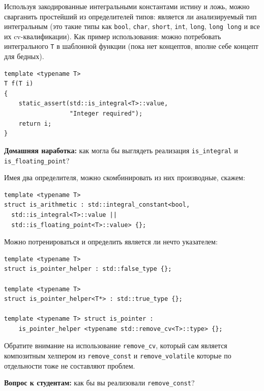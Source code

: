 \documentclass[a4paper,12pt,oneside]{article}
\newif\ifanswers
\begin{document}
Используя закодированные интегральными константами истину и ложь, можно сварганить простейший из определителей типов: является ли анализируемый тип интегральным (это такие типы как \lstinline!bool!, \lstinline!char!, \lstinline!short!, \lstinline!int!, \lstinline!long!, \lstinline!long long! и все их cv-квалификации). Как пример использования: можно потребовать интегрального \lstinline!T! в шаблонной функции (пока нет концептов, вполне себе концепт для бедных).

\begin{lstlisting}
template <typename T>
T f(T i)
{
    static_assert(std::is_integral<T>::value, 
                  "Integer required");
    return i;
}
\end{lstlisting}

\textbf{Домашняя наработка:} как могла бы выглядеть реализация \lstinline!is_integral! и \lstinline!is_floating_point!?

Имея два определителя, можно скомбинировать из них производные, скажем:

\begin{lstlisting}
template <typename T>
struct is_arithmetic : std::integral_constant<bool,
  std::is_integral<T>::value ||
  std::is_floating_point<T>::value> {};
\end{lstlisting}

Можно потренироваться и определить является ли нечто указателем:

\begin{lstlisting}
template <typename T> 
struct is_pointer_helper : std::false_type {};

template <typename T> 
struct is_pointer_helper<T*> : std::true_type {};

template <typename T> struct is_pointer : 
    is_pointer_helper <typename std::remove_cv<T>::type> {};
\end{lstlisting}

Обратите внимание на использование \lstinline!remove_cv!, который сам является композитным хелпером из \lstinline!remove_const! и \lstinline!remove_volatile! которые по отдельности тоже не составляют проблем.

\textbf{Вопрос к студентам:} как бы вы реализовали \lstinline!remove_const!? 

\ifanswers
Правильный ответ:

\begin{lstlisting}
template <typename T> 
struct remove_const { typedef T type; };
template <typename T> 
struct remove_const<const T> { typedef T type; };
\end{lstlisting}
\fi
\end{document}
